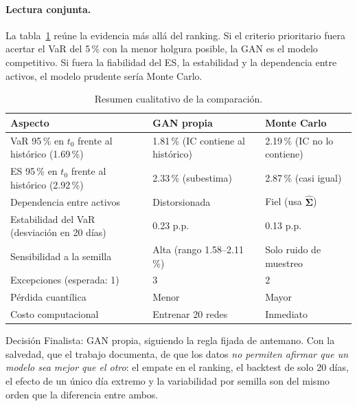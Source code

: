 \documentclass[12pt,letterpaper]{article}
\begin{document}
\paragraph{Lectura conjunta.}
La tabla~\ref{tab:cualitativa} reúne la evidencia más allá del ranking. Si el criterio prioritario fuera acertar el VaR del 5\,\% con la menor holgura posible, la GAN es el modelo competitivo. Si fuera la fiabilidad del ES, la estabilidad y la dependencia entre activos, el modelo prudente sería Monte Carlo.

\begin{table}[H]
\centering
\small
\renewcommand{\arraystretch}{1.25}
\begin{tabular}{@{}p{4.6cm}p{5.1cm}p{5.1cm}@{}}
\toprule
\textbf{Aspecto} & \textbf{GAN propia} & \textbf{Monte Carlo}\\
\midrule
VaR 95\,\% en $t_0$ frente al histórico (1.69\,\%) & 1.81\,\% (IC contiene al histórico) & 2.19\,\% (IC no lo contiene)\\
ES 95\,\% en $t_0$ frente al histórico (2.92\,\%) & 2.33\,\% (subestima) & 2.87\,\% (casi igual)\\
Dependencia entre activos & Distorsionada & Fiel (usa $\hat{\bm\Sigma}$)\\
Estabilidad del VaR (desviación en 20 días) & 0.23 p.p. & 0.13 p.p.\\
Sensibilidad a la semilla & Alta (rango 1.58--2.11\,\%) & Solo ruido de muestreo\\
Excepciones (esperada: 1) & 3 & 2\\
Pérdida cuantílica & Menor & Mayor\\
Costo computacional & Entrenar 20 redes & Inmediato\\
\bottomrule
\end{tabular}
\caption{Resumen cualitativo de la comparación.}\label{tab:cualitativa}
\end{table}

\begin{cajanota}{Decisión}
Finalista: GAN propia, siguiendo la regla fijada de antemano. Con la salvedad, que el trabajo documenta, de que los datos \emph{no permiten afirmar que un modelo sea mejor que el otro}: el empate en el ranking, el backtest de solo 20 días, el efecto de un único día extremo y la variabilidad por semilla son del mismo orden que la diferencia entre ambos.
\end{cajanota}

\end{document}
